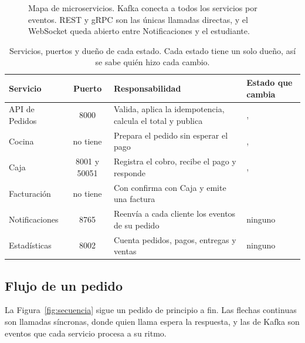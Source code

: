 \begin{figure}[H]
\caption{Mapa de microservicios. Kafka conecta a todos los servicios por eventos. REST y gRPC son las únicas llamadas directas, y el WebSocket queda abierto entre Notificaciones y el estudiante.}
\label{fig:mapa}
\end{figure}

\begin{table}[H]
\centering
\small
\begin{tabularx}{\textwidth}{@{}l c Y l@{}}
\toprule
\textbf{Servicio} & \textbf{Puerto} & \textbf{Responsabilidad} & \textbf{Estado que cambia} \\
\midrule
API de Pedidos & 8000 & Valida, aplica la idempotencia, calcula el total y publica  & ,  \\
Cocina & no tiene & Prepara el pedido sin esperar el pago & ,  \\
Caja & 8001 y 50051 & Registra el cobro, recibe el pago y responde  & ,  \\
Facturación & no tiene & Con  confirma con Caja y emite una factura &  \\
Notificaciones & 8765 & Reenvía a cada cliente los eventos de su pedido & ninguno \\
Estadísticas & 8002 & Cuenta pedidos, pagos, entregas y ventas & ninguno \\
\bottomrule
\end{tabularx}
\caption{Servicios, puertos y dueño de cada estado. Cada estado tiene un solo dueño, así se sabe quién hizo cada cambio.}
\label{tab:servicios}
\end{table}

\subsection{Flujo de un pedido}

La Figura~\ref{fig:secuencia} sigue un pedido de principio a fin. Las flechas continuas son llamadas síncronas, donde quien llama espera la respuesta, y las de Kafka son eventos que cada servicio procesa a su ritmo.

